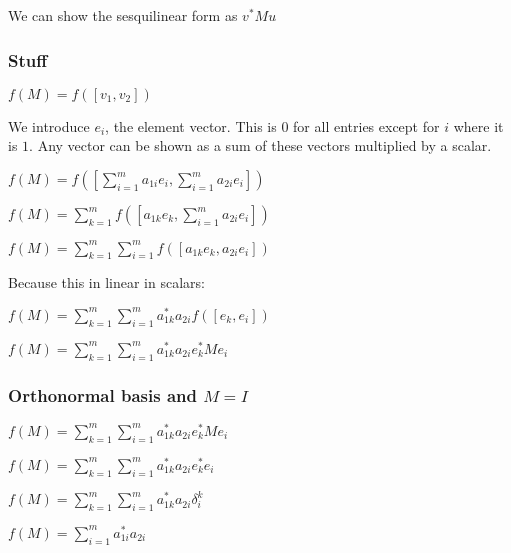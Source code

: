 We can show the sesquilinear form as \(v^*Mu\)

\subsubsection{Stuff}

$f(M)=f([v_1,v_2])$

We introduce \(e_i\), the element vector. This is \(0\) for all entries except for \(i\) where it is \(1\). Any vector can be shown as a sum of these vectors multiplied by a scalar.

$f(M)=f([\sum^m_{i=1}a_{1i}e_i,\sum^m_{i=1}a_{2i}e_i])$

$f(M)=\sum_{k=1}^mf([a_{1k}e_k,\sum^m_{i=1}a_{2i}e_i])$

$f(M)=\sum_{k=1}^m\sum^m_{i=1}f([a_{1k}e_k,a_{2i}e_i])$

Because this in linear in scalars:

$f(M)=\sum_{k=1}^m\sum^m_{i=1}a_{1k}^*a_{2i}f([e_k,e_i])$

$f(M)=\sum_{k=1}^m\sum^m_{i=1}a_{1k}^*a_{2i}e_k^*Me_i$

\subsubsection{Orthonormal basis and \(M=I\)}

$f(M)=\sum_{k=1}^m\sum^m_{i=1}a_{1k}^*a_{2i}e_k^*Me_i$

$f(M)=\sum_{k=1}^m\sum^m_{i=1}a_{1k}^*a_{2i}e_k^*e_i$

$f(M)=\sum_{k=1}^m\sum^m_{i=1}a_{1k}^*a_{2i}\delta_i^k$

$f(M)=\sum^m_{i=1}a_{1i}^*a_{2i}$

